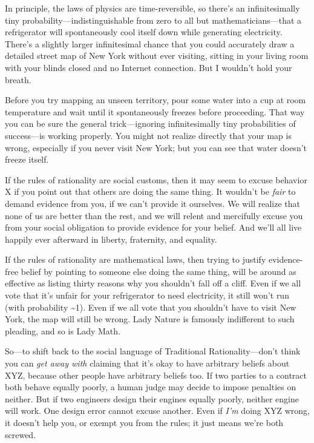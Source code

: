 {
 In principle, the laws of physics are time-reversible, so
there's an infinitesimally tiny
probability---indistinguishable from zero to all but
mathematicians---that a refrigerator will spontaneously cool itself
down while generating electricity. There's a slightly
larger infinitesimal chance that you could accurately draw a detailed
street map of New York without ever visiting, sitting in your living
room with your blinds closed and no Internet connection. But I
wouldn't hold your breath.}

{
 Before you try mapping an unseen territory, pour some water into a
cup at room temperature and wait until it spontaneously freezes before
proceeding. That way you can be sure the general trick---ignoring
infinitesimally tiny probabilities of success---is working properly.
You might not realize directly that your map is wrong, especially if
you never visit New York; but you can see that water
doesn't freeze itself.}

{
 If the rules of rationality are social customs, then it may seem
to excuse behavior X if you point out that others are doing the same
thing. It wouldn't be \textit{fair} to demand evidence
from you, if we can't provide it ourselves. We will
realize that none of us are better than the rest, and we will relent
and mercifully excuse you from your social obligation to provide
evidence for your belief. And we'll all live happily
ever afterward in liberty, fraternity, and equality.}

{
 If the rules of rationality are mathematical laws, then trying to
justify evidence-free belief by pointing to someone else doing the same
thing, will be around as effective as listing thirty reasons why you
shouldn't fall off a cliff. Even if we all vote that
it's unfair for your refrigerator to need electricity,
it still won't run (with probability \~{}1). Even if we
all vote that you shouldn't have to visit New York, the
map will still be wrong. Lady Nature is famously indifferent to such
pleading, and so is Lady Math.}

{
 So---to shift back to the social language of Traditional
Rationality---don't think you can \textit{get away
with} claiming that it's okay to have arbitrary beliefs
about XYZ, because other people have arbitrary beliefs too. If two
parties to a contract both behave equally poorly, a human judge may
decide to impose penalties on neither. But if two engineers design
their engines equally poorly, neither engine will work. One design
error cannot excuse another. Even if \textit{I'm} doing
XYZ wrong, it doesn't help you, or exempt you from the
rules; it just means we're both screwed.}

